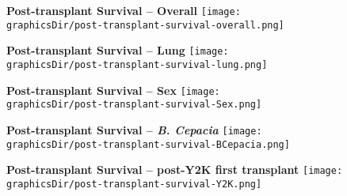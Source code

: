 
\begin{frame}{\bf Post-transplant Survival -- Overall}
\texttt{[image: \\graphicsDir/post-transplant-survival-overall.png]}
\end{frame}

\begin{frame}{\bf Post-transplant Survival -- Lung}
\texttt{[image: \\graphicsDir/post-transplant-survival-lung.png]}
\end{frame}

\begin{frame}{\bf Post-transplant Survival -- Sex}
\texttt{[image: \\graphicsDir/post-transplant-survival-Sex.png]}
\end{frame}

\begin{frame}{\bf Post-transplant Survival -- \textit{B. Cepacia}}
\texttt{[image: \\graphicsDir/post-transplant-survival-BCepacia.png]}
\end{frame}

\begin{frame}{\bf Post-transplant Survival -- post-Y2K first transplant}
\texttt{[image: \\graphicsDir/post-transplant-survival-Y2K.png]}
\end{frame}


